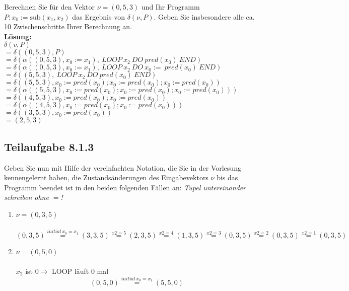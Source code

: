 \documentclass[12pt]{article}
\begin{document}
  
 Berechnen Sie für den Vektor $\nu = (0,5,3)$ und Ihr Programm $P: x_0:=\text{sub}(x_1,x_2)$ das Ergebnis von $\delta(\nu,P)$. Geben Sie insbesondere alle ca. 10 Zwischenschritte Ihrer Berechnung an.  
  \\ 
\textbf{  Lösung:
}  \\
$\delta(v,P)$\\
$=\delta((0,5,3),P)$\\
$=\delta(\alpha((0,5,3),x_0 := x_1),\ LOOP \ x_2 \ DO \ pred(x_0) \ END)$\\
$=\delta(\alpha((0,5,3),x_0 := x_1),\ LOOP \ x_2 \ DO \ x_0 := \ pred(x_0) \ END)$\\
$=\delta((5,5,3),\ LOOP \ x_2 \ DO 
\ pred(x_0) \ END)$\\
  $=\delta((5,5,3),x_0 := pred(x_0);x_0 := pred(x_0);x_0 := pred(x_0))$\\
    $=\delta(\alpha((5,5,3),x_0 := pred(x_0);x_0 := pred(x_0);x_0 := pred(x_0)))$\\
     $=\delta((4,5,3),x_0 := pred(x_0);x_0 := pred(x_0))$\\
       $=\delta(\alpha((4,5,3),x_0 := pred(x_0);x_0 := pred(x_0)))$\\
      $=\delta((3,5,3),x_0 := pred(x_0))$\\
      $=(2,5,3)$
 \subsection*{Teilaufgabe 8.1.3} 

  
 Geben Sie nun mit Hilfe der vereinfachten Notation, die Sie in der Vorlesung kennengelernt haben, die Zustandsänderungen des Eingabevektors $\nu$ bis das Programm beendet ist in den beiden folgenden Fällen an:  
\emph{  Tupel untereinander schreiben ohne $=$!
} \begin{enumerate} 
 \item $\nu = (0,3,5)$ \\
\textbf{ 
}\\
$$ (0,3,5)\overset{initial  \ x_0 = x_1}{=}(3,3,5)\overset{x2=5}{=}(2,3,5)\overset{x2=4}{=}(1,3,5)\overset{x2=3}{=}(0,3,5)\overset{x2=2}{=}(0,3,5)\overset{x2=1}{=}(0,3,5)$$ 


\item $\nu = (0,5,0)$ \\
\textbf{ 
}\\
$x_2$ ist $0 \rightarrow$ LOOP läuft $0$ mal\\
$$ (0,5,0)\overset{initial \ x_0 = x_1}{=}(5,5,0)$$ 
 \end{enumerate} 
  
\end{document}
